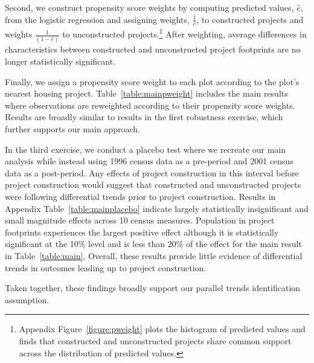 \documentclass[12pt]{article}
\begin{document}
Second, we construct propensity score weights by computing predicted values, $\hat{e}$, from the logistic regression and assigning weights, $\frac{1}{\hat{e}}$, to constructed projects and weights $\frac{1}{(1-\hat{e})}$ to unconstructed projects.\footnote{Appendix Figure~\ref{figure:pweight} plots the histogram of predicted values and finds that constructed and unconstructed projects share common support across the distribution of predicted values.}  After weighting, average differences in characteristics between constructed and unconstructed project footprints are no longer statistically significant.

Finally, we assign a propensity score weight to each plot according to the plot's nearest housing project.  Table~\ref{table:mainpweight} includes the main results where observations are reweighted according to their propensity score weights.  Results are broadly similar to results in the first robustness exercise, which further supports our main approach.

In the third exercise, we conduct a placebo test where we recreate our main analysis while instead using 1996 census data as a pre-period and 2001 census data as a post-period.  Any effects of project construction in this interval before project construction would suggest that constructed and unconstructed projects were following differential trends prior to project construction.  Results in Appendix Table~\ref{table:mainplacebo} indicate largely statistically insignificant and small magnitude effects across 10 census measures.  Population in project footprints experiences the largest positive effect although it is statistically significant at the 10\% level and is less than 20\% of the effect for the main result in Table~\ref{table:main}.  Overall, these results provide little evidence of differential trends in outcomes leading up to project construction.

Taken together, these findings broadly support our parallel trends identification assumption.




\end{document}
